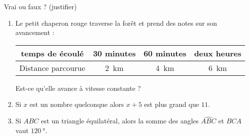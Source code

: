 
\begin{exercice}\label{exo2smath-0251}

    Vrai ou faux ? (justifier)
    \begin{enumerate}
        \item
            Le petit chaperon rouge traverse la forêt et prend des notes sur son avancement :
            \begin{center}
                \begin{tabular}[]{|c||c|c|c|}
                    \hline
                    temps de écoulé&30 minutes&60 minutes&deux heures\\
                    \hline
                    Distance parcourue&\SI{2}{\kilo\meter}&\SI{4}{\kilo\meter}&\SI{6}{\kilo\meter}\\ 
                    \hline
                \end{tabular}
            \end{center}
                Est-ce qu'elle avance à vitesse constante ?
        \item
            Si \( x\) est un nombre quelconque alors \( x+5\) est plus grand que \( 11\).
        \item
            Si \( ABC\) est un triangle équilatéral, alors la somme des angles \( \widehat{ABC}\) et \( \widehat{BCA}\) vaut \(\SI{120}{\degree}\).
    \end{enumerate}

\end{exercice}
